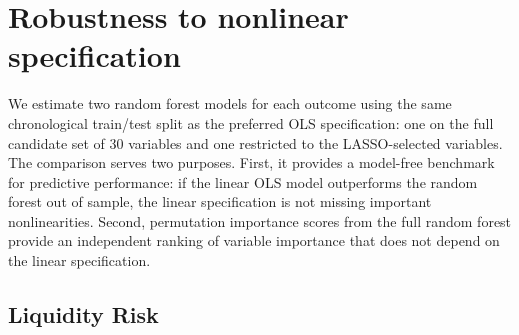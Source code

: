 \documentclass[a4paper,UKenglish,cleveref, autoref, thm-restate]{informs3}
\begin{document}

\section{Robustness to nonlinear specification}
\label{app:rf_benchmark}

We estimate two random forest models for each outcome using the 
same chronological train/test split as the preferred OLS 
specification: one on the full candidate set of 30 variables 
and one restricted to the LASSO-selected variables. The 
comparison serves two purposes. First, it provides a model-free 
benchmark for predictive performance: if the linear OLS model 
outperforms the random forest out of sample, the linear 
specification is not missing important nonlinearities. Second, 
permutation importance scores from the full random forest 
provide an independent ranking of variable importance that does 
not depend on the linear specification.

\subsection{Liquidity Risk}
\label{app:rf_benchmark_liq}
\end{document}
